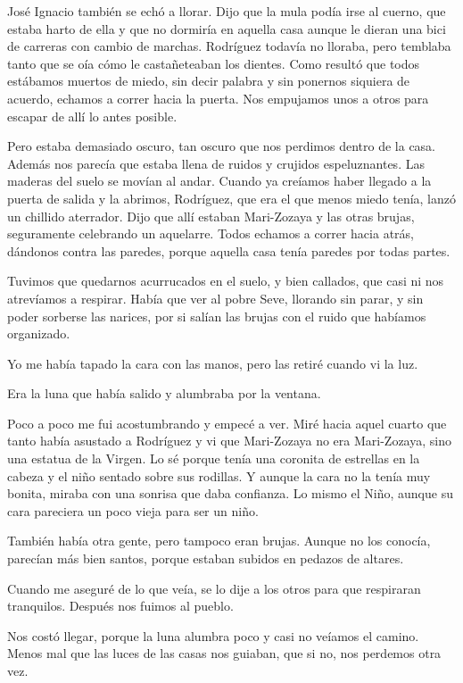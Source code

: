 \documentclass{barcodevapor3pags}
\begin{document}
José Ignacio también se echó a llorar. Dijo que la mula podía irse al
cuerno, que estaba harto de ella y que no dormiría en aquella casa
aunque le dieran una bici de carreras con cambio de marchas. Rodríguez todavía no lloraba, pero temblaba tanto que se oía cómo le
castañeteaban los dientes. Como resultó que todos estábamos muertos de
miedo, sin decir palabra y sin ponernos siquiera de acuerdo, echamos a
correr hacia la puerta. Nos empujamos unos a otros para escapar de allí
lo antes posible.~

Pero estaba demasiado oscuro, tan oscuro que nos perdimos dentro de la
casa. Además nos parecía que estaba llena de ruidos y crujidos
espeluznantes. Las maderas del suelo se movían al andar. Cuando ya
creíamos haber llegado a la puerta de salida y la abrimos, Rodríguez,
que era el que menos miedo tenía, lanzó un chillido aterrador. Dijo que
allí estaban Mari-Zozaya y las otras brujas, seguramente celebrando un
aquelarre. Todos echamos a correr hacia atrás, dándonos contra las
paredes, porque aquella casa tenía paredes por todas partes.~

Tuvimos que quedarnos acurrucados en el suelo, y bien callados, que casi
ni nos atrevíamos a respirar. Había que ver al pobre Seve, llorando sin
parar, y sin poder sorberse las narices, por si salían las brujas con el
ruido que habíamos organizado.~

Yo me había tapado la cara con las manos, pero las retiré cuando vi la
luz.~

Era la luna que había salido y alumbraba por la ventana.~

Poco a poco me fui acostumbrando y empecé a ver. Miré hacia aquel cuarto
que tanto había asustado a Rodríguez y vi que Mari-Zozaya no era
Mari-Zozaya, sino una estatua de la Virgen. Lo sé porque tenía una
coronita de estrellas en la cabeza y el niño sentado sobre sus rodillas.
Y aunque la cara no la tenía muy bonita, miraba con una sonrisa que daba
confianza. Lo mismo el Niño, aunque su cara pareciera un poco vieja para
ser un niño.~

También había otra gente, pero tampoco eran brujas. Aunque no los
conocía, parecían más bien santos, porque estaban subidos en pedazos de
altares.~

Cuando me aseguré de lo que veía, se lo dije a los otros para que
respiraran tranquilos. Después nos fuimos al pueblo.


Nos costó llegar, porque la luna alumbra poco y casi no veíamos el
camino. Menos mal que las luces de las casas nos guiaban, que si no, nos
perdemos otra vez.~
\end{document}
